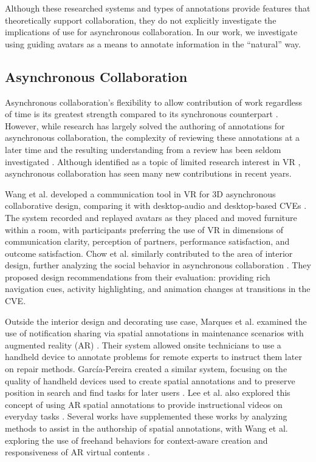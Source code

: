 \noindent Although these researched systems and types of annotations provide features that theoretically support collaboration, they do not explicitly investigate the implications of use for asynchronous collaboration.
In our work, we investigate using guiding avatars as a means to annotate information in the ``natural'' way.


\subsection{Asynchronous Collaboration}
Asynchronous collaboration's flexibility to allow contribution of work regardless of time is its greatest strength compared to its synchronous counterpart \cite{Irlitti_InteractAsync2013}.
However, while research has largely solved the authoring of annotations for asynchronous collaboration, the complexity of reviewing these annotations at a later time and the resulting understanding from a review has been seldom investigated \cite{Irlitti_ChallengesAsync2016}.
Although identified as a topic of limited research interest in VR \cite{Pidel_CollabSystematic2020}, asynchronous collaboration has seen many new contributions in recent years.

Wang et al. developed a communication tool in VR for 3D asynchronous collaborative design, comparing it with desktop-audio and desktop-based CVEs \cite{Wang_VRReplay2019}.
The system recorded and replayed avatars as they placed and moved furniture within a room, with participants preferring the use of VR in dimensions of communication clarity, perception of partners, performance satisfaction, and outcome satisfaction.
Chow et al. similarly contributed to the area of interior design, further analyzing the social behavior in asynchronous collaboration \cite{Chow_ChallengesAsyncCollabVR2019}.
They proposed design recommendations from their evaluation: providing rich navigation cues, activity highlighting, and animation changes at transitions in the CVE.

Outside the interior design and decorating use case, Marques et al. examined the use of notification sharing via spatial annotations in maintenance scenarios with augmented reality (AR) \cite{Marques_RemoteAsyncCollab2021, Marques_AsyncNotifications2022}.
Their system allowed onsite technicians to use a handheld device to annotate problems for remote experts to instruct them later on repair methods.
García-Pereira created a similar system, focusing on the quality of handheld devices used to create spatial annotations and to preserve position in search and find tasks for later users \cite{Garcia_CrossDeviceARAnnotations2021}.
Lee et al. also explored this concept of using AR spatial annotations to provide instructional videos on everyday tasks \cite{Lee_EnhancingInstructionVideos2020}.
Several works have supplemented these works by analyzing methods to assist in the authorship of spatial annotations, with Wang et al. exploring the use of freehand behaviors for context-aware creation and responsiveness of AR virtual contents \cite{Wang_CAPturAR2020, Wang_GesturAR2021}.


